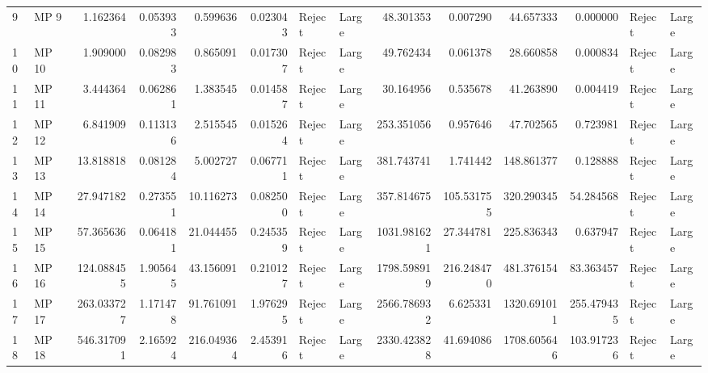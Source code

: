 \begin{tabular}{llrrrrllrrrrll}
9  &   MP 9 &           1.162364 &  0.053933 &            0.599636 &  0.023043 &   Reject &       Large &                48.301353 &    0.007290 &                 44.657333 &    0.000000 &   Reject &       Large \\
10 &  MP 10 &           1.909000 &  0.082983 &            0.865091 &  0.017307 &   Reject &       Large &                49.762434 &    0.061378 &                 28.660858 &    0.000834 &   Reject &       Large \\
11 &  MP 11 &           3.444364 &  0.062861 &            1.383545 &  0.014587 &   Reject &       Large &                30.164956 &    0.535678 &                 41.263890 &    0.004419 &   Reject &       Large \\
12 &  MP 12 &           6.841909 &  0.113136 &            2.515545 &  0.015264 &   Reject &       Large &               253.351056 &    0.957646 &                 47.702565 &    0.723981 &   Reject &       Large \\
13 &  MP 13 &          13.818818 &  0.081284 &            5.002727 &  0.067711 &   Reject &       Large &               381.743741 &    1.741442 &                148.861377 &    0.128888 &   Reject &       Large \\
14 &  MP 14 &          27.947182 &  0.273551 &           10.116273 &  0.082500 &   Reject &       Large &               357.814675 &  105.531755 &                320.290345 &   54.284568 &   Reject &       Large \\
15 &  MP 15 &          57.365636 &  0.064181 &           21.044455 &  0.245359 &   Reject &       Large &              1031.981621 &   27.344781 &                225.836343 &    0.637947 &   Reject &       Large \\
16 &  MP 16 &         124.088455 &  1.905645 &           43.156091 &  0.210127 &   Reject &       Large &              1798.598919 &  216.248470 &                481.376154 &   83.363457 &   Reject &       Large \\
17 &  MP 17 &         263.033727 &  1.171478 &           91.761091 &  1.976295 &   Reject &       Large &              2566.786932 &    6.625331 &               1320.691011 &  255.479435 &   Reject &       Large \\
18 &  MP 18 &         546.317091 &  2.165924 &          216.049364 &  2.453916 &   Reject &       Large &              2330.423828 &   41.694086 &               1708.605646 &  103.917236 &   Reject &       Large \\
\bottomrule
\end{tabular}
